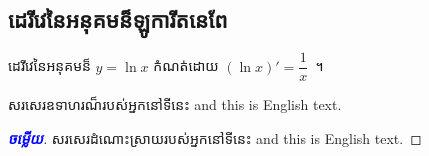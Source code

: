 \documentclass[a4paper,12pt]{book}
\newcommand{\answer}{\textcolor{blue}{\bfseries ចម្លើយ}}
\begin{document}
	\subsection{ដេរីវេនៃអនុគមន៏ឡូការីតនេពែ}
	\vspace{1ex}
	\begin{multicols}{2}
	\begin{definition}{}{}
		ដេរីវេនៃអនុគមន៏ $ y=\ln x $ កំណត់ដោយ $ (\ln x)'=\dfrac{1}{x} $~។
	\end{definition}
	\begin{example}{}{}
		សរសេរឧទាហរណ៏របស់អ្នកនៅទីនេះ \textenglish{and this is English text.}
	\end{example}
	\end{multicols}
	\begin{proof}[\answer]
		សរសេរដំណោះស្រាយរបស់អ្នកនៅទីនេះ \textenglish{and this is English text.}
	\end{proof}
\end{document}
